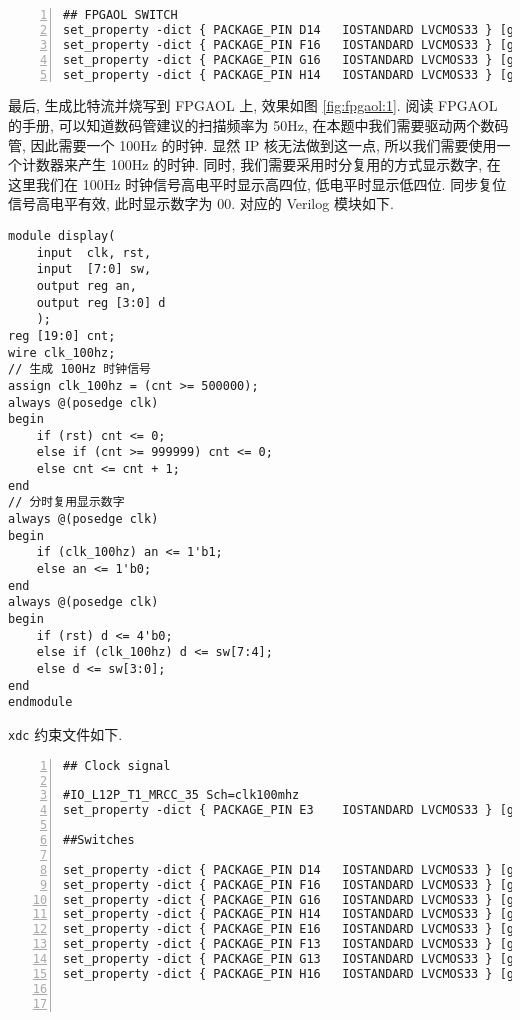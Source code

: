\documentclass[UTF8,fontset=fandol]{ctexart}
\begin{document}
\begin{ExQuestions}
\begin{lstlisting}[basicstyle=\footnotesize\ttfamily, numbers = left, language = XML, frame=lrtb, frameround=tttt, caption={xdc 约束文件}]
## FPGAOL SWITCH
set_property -dict { PACKAGE_PIN D14   IOSTANDARD LVCMOS33 } [get_ports { sw[0] }];
set_property -dict { PACKAGE_PIN F16   IOSTANDARD LVCMOS33 } [get_ports { sw[1] }];
set_property -dict { PACKAGE_PIN G16   IOSTANDARD LVCMOS33 } [get_ports { sw[2] }];
set_property -dict { PACKAGE_PIN H14   IOSTANDARD LVCMOS33 } [get_ports { sw[3] }];
  \end{lstlisting}
  最后, 生成比特流并烧写到 FPGAOL 上, 效果如图 \ref{fig:fpgaol:1}.
  \newpage
  \question 阅读 FPGAOL 的手册, 可以知道数码管建议的扫描频率为 50Hz, 在本题中我们需要驱动两个数码管, 因此需要一个 100Hz 的时钟. 显然 IP 核无法做到这一点, 所以我们需要使用一个计数器来产生 100Hz 的时钟.
  同时, 我们需要采用时分复用的方式显示数字, 在这里我们在 100Hz 时钟信号高电平时显示高四位, 低电平时显示低四位. 同步复位信号高电平有效, 此时显示数字为 00. 对应的 Verilog 模块如下.
  \begin{lstlisting}[style=verilogstyle, caption={分时复用显示数字}]
module display(
    input  clk, rst,
    input  [7:0] sw,
    output reg an,
    output reg [3:0] d
    );
reg [19:0] cnt;
wire clk_100hz;
// 生成 100Hz 时钟信号
assign clk_100hz = (cnt >= 500000);
always @(posedge clk)
begin
    if (rst) cnt <= 0;
    else if (cnt >= 999999) cnt <= 0;
    else cnt <= cnt + 1;
end
// 分时复用显示数字
always @(posedge clk)
begin
    if (clk_100hz) an <= 1'b1;
    else an <= 1'b0;
end
always @(posedge clk)
begin
    if (rst) d <= 4'b0;
    else if (clk_100hz) d <= sw[7:4];
    else d <= sw[3:0];
end
endmodule
  \end{lstlisting}
  \texttt{xdc} 约束文件如下.
  \begin{lstlisting}[basicstyle=\footnotesize\ttfamily, numbers = left, language = XML, frame=lrtb, frameround=tttt, caption={xdc 约束文件}]
## Clock signal

#IO_L12P_T1_MRCC_35 Sch=clk100mhz
set_property -dict { PACKAGE_PIN E3    IOSTANDARD LVCMOS33 } [get_ports { clk }]; 

##Switches

set_property -dict { PACKAGE_PIN D14   IOSTANDARD LVCMOS33 } [get_ports { sw[0] }]; 
set_property -dict { PACKAGE_PIN F16   IOSTANDARD LVCMOS33 } [get_ports { sw[1] }]; 
set_property -dict { PACKAGE_PIN G16   IOSTANDARD LVCMOS33 } [get_ports { sw[2] }]; 
set_property -dict { PACKAGE_PIN H14   IOSTANDARD LVCMOS33 } [get_ports { sw[3] }]; 
set_property -dict { PACKAGE_PIN E16   IOSTANDARD LVCMOS33 } [get_ports { sw[4] }]; 
set_property -dict { PACKAGE_PIN F13   IOSTANDARD LVCMOS33 } [get_ports { sw[5] }]; 
set_property -dict { PACKAGE_PIN G13   IOSTANDARD LVCMOS33 } [get_ports { sw[6] }]; 
set_property -dict { PACKAGE_PIN H16   IOSTANDARD LVCMOS33 } [get_ports { sw[7] }]; 



\end{lstlisting}
\end{ExQuestions}
\end{document}
